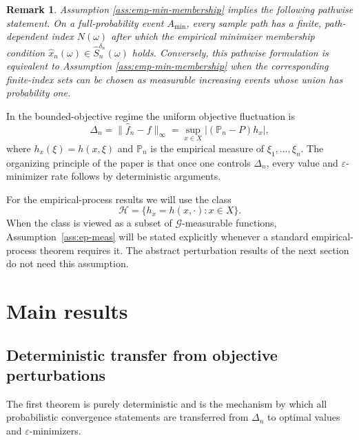 \documentclass[11pt]{article}
\newtheorem{remark}[theorem]{Remark}
\begin{document}
\begin{remark}
Assumption \ref{ass:emp-min-membership} implies the following pathwise statement. On a full-probability event
$A_{\mathrm{min}}$, every sample path has a finite, path-dependent index
$N(\omega)$ after which the empirical minimizer membership condition $\hat{x}_{n}(\omega)\in\hat{S}_{n}^{\delta_{n}}(\omega)$ holds. Conversely, this pathwise formulation is equivalent to Assumption \ref{ass:emp-min-membership} when the corresponding finite-index sets can be chosen as measurable increasing events whose union has probability one.
\end{remark}

In the bounded-objective regime the uniform objective fluctuation
is 
\begin{equation}
\Delta_{n}=\lVert\hat{f}_{n}-f\rVert_{\infty}=\sup_{x\in X}\bigl|(\mathbb{P}_{n}-P)h_{x}\bigr|,\label{eq:Delta-def}
\end{equation}
where $h_{x}(\xi)=h(x,\xi)$ and $\mathbb{P}_{n}$ is the empirical
measure of $\xi_{1},\dots,\xi_{n}$. The organizing principle of the
paper is that once one controls $\Delta_{n}$, every value and $\varepsilon$-minimizer
rate follows by deterministic arguments.

For the empirical-process results we will use the class 
\[
\mathcal{H}=\{h_{x}=h(x,\cdot):x\in X\}.
\]
When the class is viewed as a subset of $\mathcal{G}$-measurable functions,
Assumption~\ref{ass:ep-meas}
will be stated explicitly whenever a standard empirical-process theorem
requires it. The abstract perturbation results of the next section
do not need this assumption.

\section{Main results}

\label{sec:main}

\subsection{Deterministic transfer from objective perturbations}

The first theorem is purely deterministic and is the mechanism by
which all probabilistic convergence statements are transferred from
$\Delta_{n}$ to optimal values and $\varepsilon$-minimizers.
\end{document}
